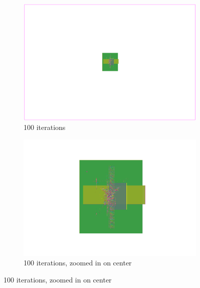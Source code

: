 \begin{figure}[p]
 \begin{subfigure}{.48\textwidth}
  \includegraphics[width=\textwidth]{epsilon/placement_Chip2_100_iterations.png}
  \caption{100 iterations}
 \end{subfigure}
 \hfill
 \begin{subfigure}{.48\textwidth}
  \includegraphics[width=\textwidth, frame]{epsilon/placement_Chip2_100_iterations_zoomed.png}
  \caption{100 iterations, zoomed in on center}
 \end{subfigure}
 
 \bigskip
 

\end{figure}
